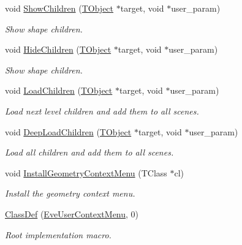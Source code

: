 \begin{DoxyCompactItemize}
void \hyperlink{class_d_d4hep_1_1_eve_user_context_menu_a246160e0e92283c590666845eea452e9}{ShowChildren} (\hyperlink{class_t_object}{TObject} $\ast$target, void $\ast$user\_\-param)
\begin{DoxyCompactList}\small\item\em Show shape children. \item\end{DoxyCompactList}\item 
void \hyperlink{class_d_d4hep_1_1_eve_user_context_menu_a3dd44ef5d2c2a19002a584bb3aa0b10e}{HideChildren} (\hyperlink{class_t_object}{TObject} $\ast$target, void $\ast$user\_\-param)
\begin{DoxyCompactList}\small\item\em Show shape children. \item\end{DoxyCompactList}\item 
void \hyperlink{class_d_d4hep_1_1_eve_user_context_menu_a79e2490b2f169394ea18c19c3271e195}{LoadChildren} (\hyperlink{class_t_object}{TObject} $\ast$target, void $\ast$user\_\-param)
\begin{DoxyCompactList}\small\item\em Load next level children and add them to all scenes. \item\end{DoxyCompactList}\item 
void \hyperlink{class_d_d4hep_1_1_eve_user_context_menu_a10d91b40facd41a45d562d9667767884}{DeepLoadChildren} (\hyperlink{class_t_object}{TObject} $\ast$target, void $\ast$user\_\-param)
\begin{DoxyCompactList}\small\item\em Load all children and add them to all scenes. \item\end{DoxyCompactList}\item 
void \hyperlink{class_d_d4hep_1_1_eve_user_context_menu_a659b7acc26b0a8812cb688149d44a20d}{InstallGeometryContextMenu} (TClass $\ast$cl)
\begin{DoxyCompactList}\small\item\em Install the geometry context menu. \item\end{DoxyCompactList}\item 
\hyperlink{class_d_d4hep_1_1_eve_user_context_menu_a05246cb30938d2a51dbb68468a3e8f8f}{ClassDef} (\hyperlink{class_d_d4hep_1_1_eve_user_context_menu}{EveUserContextMenu}, 0)
\begin{DoxyCompactList}\small\item\em Root implementation macro. \item\end{DoxyCompactList}\end{DoxyCompactItemize}

